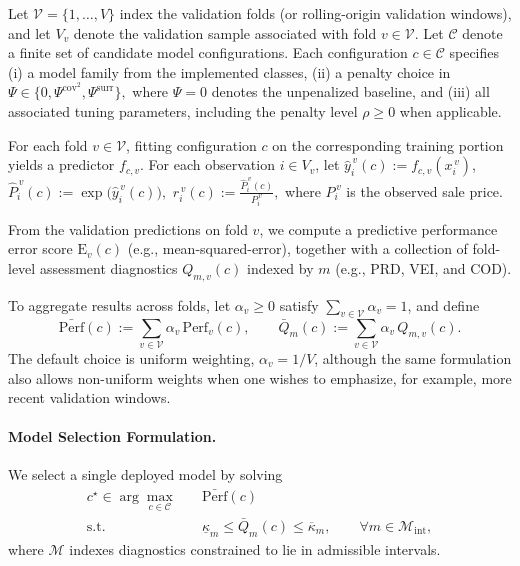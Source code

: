 \documentclass[12pt]{article}
\theoremstyle{plain}
\theoremstyle{definition}
\newcommand{\1}{\mathbf{1}}
\begin{document}
Let $\mathcal V=\{1,\dots,V\}$ index the validation folds (or rolling-origin validation windows), and let $V_v$ denote the validation sample associated with fold $v\in\mathcal V$. Let $\mathcal C$ denote a finite set of candidate model configurations. Each configuration $c\in\mathcal C$ specifies
(i) a model family from the implemented classes,
(ii) a penalty choice in
$
\Psi \in \{0,\Psi^{\mathrm{cov}^2},\Psi^{\mathrm{surr}}\},
$
where $\Psi=0$ denotes the unpenalized baseline,
and
(iii) all associated tuning parameters, including the penalty level $\rho\ge 0$ when applicable.

For each fold $v\in\mathcal V$, fitting configuration $c$ on the corresponding training portion yields a predictor $f_{c,v}$. For each observation $i\in V_v$, let
$
\hat y_i^{\,v}(c):=f_{c,v}(x_i^{\,v})$, $
\hat P_i^{\,v}(c):=\exp\!\bigl(\hat y_i^{\,v}(c)\bigr),$
$r_i^{\,v}(c):=\frac{\hat P_i^{\,v}(c)}{P_i^{\,v}},
$
where $P_i^{\,v}$ is the observed sale price. 

From the validation predictions on fold $v$, we compute a predictive performance error score $\mathrm{E}_v(c)$ (e.g., mean-squared-error), together with a collection of fold-level assessment diagnostics $Q_{m,v}(c)$ indexed by $m$ (e.g., PRD, VEI, and COD). 


To aggregate results across folds, let $\alpha_v\ge 0$ satisfy $\sum_{v\in\mathcal V}\alpha_v=1$, and define
\[
\bar{\mathrm{Perf}}(c):=\sum_{v\in\mathcal V}\alpha_v\,\mathrm{Perf}_v(c),
\qquad
\bar Q_m(c):=\sum_{v\in\mathcal V}\alpha_v\,Q_{m,v}(c).
\]
The default choice is uniform weighting, $\alpha_v=1/V$, although the same formulation also allows non-uniform weights when one wishes to emphasize, for example, more recent validation windows.


\paragraph{Model Selection Formulation.} 
We select a single deployed model by solving
\begin{align}
    \label{opt:model_selection_single}
    c^\star
    \in
    \arg\max_{c\in\mathcal C}
    \quad
    & \bar{\mathrm{Perf}}(c)
    \\
    \text{s.t.}\quad
    & \underline{\kappa}_m \le \bar Q_m(c) \le \overline{\kappa}_m,
    \qquad \forall m\in\mathcal M_{\mathrm{int}},
    \nonumber
\end{align}
where $\mathcal M$ indexes diagnostics constrained to lie in admissible intervals.
\end{document}
